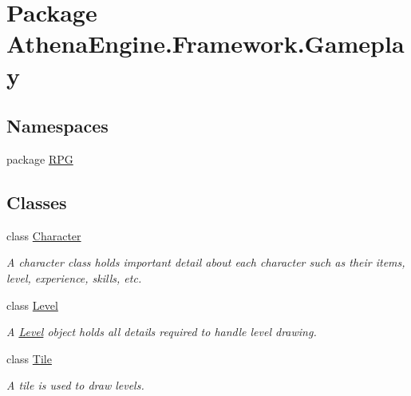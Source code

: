 \hypertarget{namespace_athena_engine_1_1_framework_1_1_gameplay}{\section{Package Athena\-Engine.\-Framework.\-Gameplay}
\label{namespace_athena_engine_1_1_framework_1_1_gameplay}
}
\subsection*{Namespaces}
\begin{DoxyCompactItemize}
\item 
package \hyperlink{namespace_athena_engine_1_1_framework_1_1_gameplay_1_1_r_p_g}{R\-P\-G}
\end{DoxyCompactItemize}
\subsection*{Classes}
\begin{DoxyCompactItemize}
\item 
class \hyperlink{class_athena_engine_1_1_framework_1_1_gameplay_1_1_character}{Character}
\begin{DoxyCompactList}\small\item\em A character class holds important detail about each character such as their items, level, experience, skills, etc. \end{DoxyCompactList}\item 
class \hyperlink{class_athena_engine_1_1_framework_1_1_gameplay_1_1_level}{Level}
\begin{DoxyCompactList}\small\item\em A \hyperlink{class_athena_engine_1_1_framework_1_1_gameplay_1_1_level}{Level} object holds all details required to handle level drawing. \end{DoxyCompactList}\item 
class \hyperlink{class_athena_engine_1_1_framework_1_1_gameplay_1_1_tile}{Tile}
\begin{DoxyCompactList}\small\item\em A tile is used to draw levels. \end{DoxyCompactList}\end{DoxyCompactItemize}
